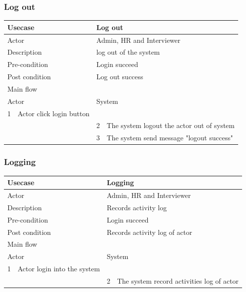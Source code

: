\documentclass[a4paper]{article}
\begin{document}
\subsubsection{Log out}
\begin{tabular}{|l|p{5cm}||l|p{5cm}|}
	\hline 
	\multicolumn{2}{|p{5cm}|}{Usecase} & \multicolumn{2}{|p{5cm}|}{Log out}\\ 
	\hline 
	\multicolumn{2}{|p{5cm}|}{Actor} & \multicolumn{2}{|p{5cm}|}{Admin, HR and Interviewer} \\ 
	\hline 
	\multicolumn{2}{|p{5cm}|}{Description} & \multicolumn{2}{|p{5cm}|}{log out of the system}\\
	\hline
	\multicolumn{2}{|p{5cm}|}{Pre-condition} & \multicolumn{2}{|p{5cm}|}{Login succeed}\\
	\hline
	\multicolumn{2}{|p{5cm}|}{Post condition} & \multicolumn{2}{|p{5cm}|}{Log out success} \\
	\hline
	\multicolumn{4}{|l|}{Main flow} \\
	\hline
	\multicolumn{2}{|p{5cm}|}{Actor} & \multicolumn{2}{|p{5cm}|}{System} \\
	\hline
	1 & Actor click login button & &  \\
	\hline
	& & 2 & The system logout the actor out of system  \\
	\hline 
	& & 3 & The system send message "logout success"  \\
	\hline
\end{tabular}

\subsubsection{Logging}
\begin{tabular}{|l|p{5cm}||l|p{5cm}|}
	\hline 
	\multicolumn{2}{|p{5cm}|}{Usecase} & \multicolumn{2}{|p{5cm}|}{Logging}\\ 
	\hline 
	\multicolumn{2}{|p{5cm}|}{Actor} & \multicolumn{2}{|p{5cm}|}{Admin, HR and Interviewer} \\ 
	\hline 
	\multicolumn{2}{|p{5cm}|}{Description} & \multicolumn{2}{|p{5cm}|}{Records activity log}\\
	\hline
	\multicolumn{2}{|p{5cm}|}{Pre-condition} & \multicolumn{2}{|p{5cm}|}{Login succeed}\\
	\hline
	\multicolumn{2}{|p{5cm}|}{Post condition} & \multicolumn{2}{|p{5cm}|}{Records activity log of actor} \\
	\hline
	\multicolumn{4}{|l|}{Main flow} \\
	\hline
	\multicolumn{2}{|p{5cm}|}{Actor} & \multicolumn{2}{|p{5cm}|}{System} \\
	\hline
	1 & Actor login into the system & & \\
	\hline
	& & 2 & The system record activities log of actor \\
	\hline
\end{tabular}
\end{document}
